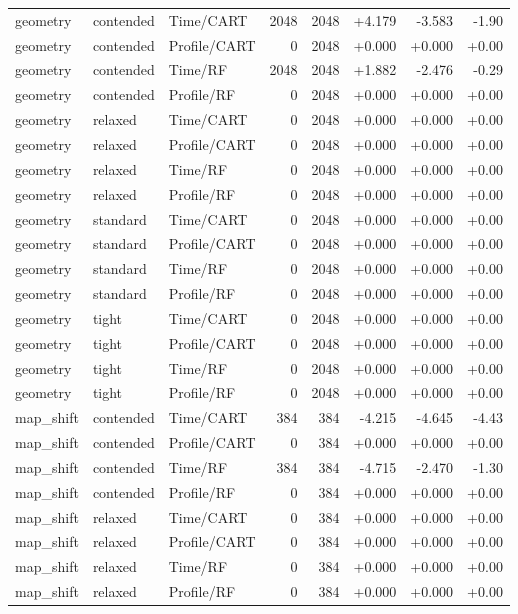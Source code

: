 \begin{longtable}{@{}lllrrrrr@{}}
geometry & contended & Time/CART & 2048 & 2048 & +4.179 & -3.583 & -1.90\\
geometry & contended & Profile/CART & 0 & 2048 & +0.000 & +0.000 & +0.00\\
geometry & contended & Time/RF & 2048 & 2048 & +1.882 & -2.476 & -0.29\\
geometry & contended & Profile/RF & 0 & 2048 & +0.000 & +0.000 & +0.00\\
geometry & relaxed & Time/CART & 0 & 2048 & +0.000 & +0.000 & +0.00\\
geometry & relaxed & Profile/CART & 0 & 2048 & +0.000 & +0.000 & +0.00\\
geometry & relaxed & Time/RF & 0 & 2048 & +0.000 & +0.000 & +0.00\\
geometry & relaxed & Profile/RF & 0 & 2048 & +0.000 & +0.000 & +0.00\\
geometry & standard & Time/CART & 0 & 2048 & +0.000 & +0.000 & +0.00\\
geometry & standard & Profile/CART & 0 & 2048 & +0.000 & +0.000 & +0.00\\
geometry & standard & Time/RF & 0 & 2048 & +0.000 & +0.000 & +0.00\\
geometry & standard & Profile/RF & 0 & 2048 & +0.000 & +0.000 & +0.00\\
geometry & tight & Time/CART & 0 & 2048 & +0.000 & +0.000 & +0.00\\
geometry & tight & Profile/CART & 0 & 2048 & +0.000 & +0.000 & +0.00\\
geometry & tight & Time/RF & 0 & 2048 & +0.000 & +0.000 & +0.00\\
geometry & tight & Profile/RF & 0 & 2048 & +0.000 & +0.000 & +0.00\\
map\_shift & contended & Time/CART & 384 & 384 & -4.215 & -4.645 & -4.43\\
map\_shift & contended & Profile/CART & 0 & 384 & +0.000 & +0.000 & +0.00\\
map\_shift & contended & Time/RF & 384 & 384 & -4.715 & -2.470 & -1.30\\
map\_shift & contended & Profile/RF & 0 & 384 & +0.000 & +0.000 & +0.00\\
map\_shift & relaxed & Time/CART & 0 & 384 & +0.000 & +0.000 & +0.00\\
map\_shift & relaxed & Profile/CART & 0 & 384 & +0.000 & +0.000 & +0.00\\
map\_shift & relaxed & Time/RF & 0 & 384 & +0.000 & +0.000 & +0.00\\
map\_shift & relaxed & Profile/RF & 0 & 384 & +0.000 & +0.000 & +0.00\\

\end{longtable}
